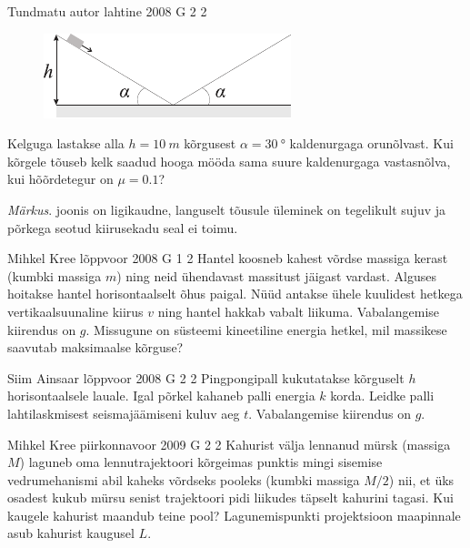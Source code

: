 \documentclass[11pt, twoside]{article}
\begin{document}
{%
{Tundmatu autor} %
{lahtine} %
{2008} %
{G 2} %
{2} %
{
\ifStatement
\begin{figure}
	\begin{center}
		\vspace{-20pt}
		\hspace{-10pt}
		\includegraphics[width=\linewidth]{2008-lahg-02-yl}
	\end{center}
\end{figure}
Kelguga lastakse alla $h = \SI{10}{m}$ kõrgusest $\alpha = \SI{30}{\degree}$ kaldenurgaga orunõlvast. Kui kõrgele tõuseb kelk saadud hooga mööda sama suure kaldenurgaga vastasnõlva, kui hõõrdetegur on $\mu = \num{0,1}$? 

\emph{Märkus}. joonis on ligikaudne, languselt tõusule üleminek on tegelikult sujuv ja põrkega seotud kiirusekadu seal ei toimu.
\fi
}

{Mihkel Kree} %
{lõppvoor} %
{2008} %
{G 1} %
{2} %
{
\ifStatement
Hantel koosneb kahest võrdse massiga kerast (kumbki massiga $m$) ning neid ühendavast massitust jäigast vardast. Alguses hoitakse hantel horisontaalselt õhus paigal. Nüüd antakse ühele kuulidest hetkega vertikaalsuunaline kiirus $v$ ning hantel hakkab vabalt liikuma. Vabalangemise kiirendus on $g$. Missugune on süsteemi kineetiline energia hetkel, mil massikese saavutab maksimaalse kõrguse?
\fi
}

{Siim Ainsaar} %
{lõppvoor} %
{2008} %
{G 2} %
{2} %
{
\ifStatement
Pingpongipall kukutatakse kõrguselt $h$ horisontaalsele lauale. Igal põrkel kahaneb palli energia $k$ korda. Leidke palli lahtilaskmisest seismajäämiseni kuluv aeg $t$. Vabalangemise kiirendus on $g$.
\fi
}

{Mihkel Kree} %
{piirkonnavoor} %
{2009} %
{G 2} %
{2} %
{
\ifStatement
Kahurist välja lennanud mürsk (massiga $M$) laguneb oma lennutrajektoori kõrgeimas punktis mingi sisemise vedrumehanismi abil kaheks võrdseks pooleks (kumbki massiga $M/2$) nii, et üks osadest kukub mürsu senist trajektoori pidi liikudes täpselt kahurini tagasi. Kui kaugele kahurist maandub teine pool? Lagunemispunkti projektsioon maapinnale asub kahurist kaugusel $L$.
\fi
}

}
\end{document}

